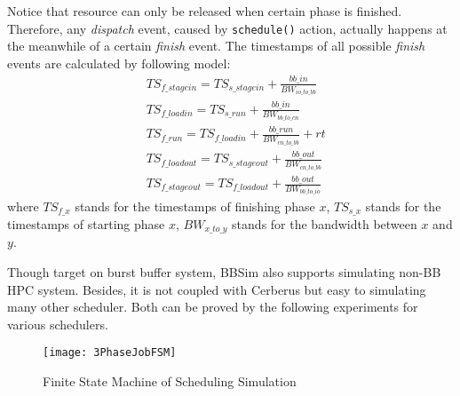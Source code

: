Notice that resource can only be released when certain phase is finished.
Therefore, any \textit{dispatch} event, caused by \texttt{schedule()} action, actually happens
at the meanwhile of a certain \textit{finish} event.
The timestamps of all possible \textit{finish} events are calculated by following model:
\begin{align}
        & TS_{f\_stagein} = TS_{s\_stagein} + \frac{bb\_in}{BW_{io\_to\_bb}}\label{Equ:FinIn} \\
        & TS_{f\_loadin} = TS_{s\_run} + \frac{bb\_in}{BW_{bb\_to\_cn}}\label{Equ:FinMemIn} \\
        & TS_{f\_run} = TS_{f\_loadin} + \frac{bb\_run}{BW_{cn\_to\_bb}} + rt\label{Equ:FinRun} \\
        & TS_{f\_loadout} = TS_{s\_stageout} + \frac{bb\_out}{BW_{cn\_to\_bb}}\label{Equ:FinMemOut} \\
        & TS_{f\_stageout} = TS_{f\_loadout} + \frac{bb\_out}{BW_{bb\_to\_io}} \label{Equ:FinOut}
\end{align}
where $TS_{f\_x}$ stands for the timestamps of finishing phase $x$,
$TS_{s\_x}$ stands for the timestamps of starting phase $x$,
$BW_{x\_to\_y}$ stands for the bandwidth between $x$ and $y$.

Though target on burst buffer system, BBSim also supports simulating non-BB HPC system.
Besides, it is not coupled with Cerberus but easy to simulating many other scheduler.
Both can be proved by the following experiments for various schedulers.

\begin{figure}[!t]
\centering
        \texttt{[image: 3PhaseJobFSM]}
        \caption{Finite State Machine of Scheduling Simulation}
\label{Fig:JobFSM}
\end{figure}

